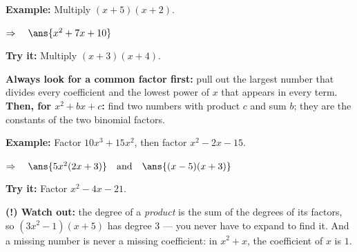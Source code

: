 \documentclass[12pt]{article}
\begin{document}
\begin{examplebox}
\textbf{Example:} \quad Multiply $(x+5)(x+2)$.

$\Rightarrow\quad \ans{x^2 + 7x + 10}$
\end{examplebox}

\begin{tryitbox}
\textbf{Try it:} \quad Multiply $(x+3)(x+4)$.\\[2pt]
\end{tryitbox}


\begin{formulabox}
\textbf{Always look for a common factor first:} pull out the largest number that divides every
coefficient and the lowest power of $x$ that appears in every term.
\textbf{Then, for $x^2 + bx + c$:} find two numbers with product $c$ and sum $b$; they are the
constants of the two binomial factors.
\end{formulabox}

\begin{examplebox}
\textbf{Example:} \quad Factor $10x^3 + 15x^2$, then factor $x^2 - 2x - 15$.

$\Rightarrow\quad \ans{5x^2(2x + 3)} \quad\text{and}\quad \ans{(x - 5)(x + 3)}$
\end{examplebox}

\begin{tryitbox}
\textbf{Try it:} \quad Factor $x^2 - 4x - 21$.\\[2pt]
\end{tryitbox}

\begin{watchoutbox}
\textbf{(!) Watch out:} the degree of a \emph{product} is the sum of the degrees of its factors,
so $(3x^2-1)(x+5)$ has degree $3$ --- you never have to expand to find it. And a missing number
is never a missing coefficient: in $x^2 + x$, the coefficient of $x$ is $1$.
\end{watchoutbox}
\end{document}
